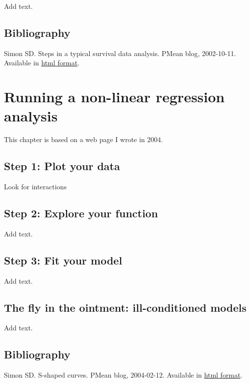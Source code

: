 \documentclass[
  letterpaper,
  DIV=11,
  numbers=noendperiod]{scrreprt}
\begin{document}
\begin{tcolorbox}
Add text.

\section{Bibliography}\label{bibliography-13}

Simon SD. Steps in a typical survival data analysis. PMean blog,
2002-10-11. Available in
\href{http://pmean.com/posts/steps-in-survival-analysis/}{html format}.


\chapter{Running a non-linear regression
analysis}\label{running-a-non-linear-regression-analysis}

This chapter is based on a web page I wrote in 2004.

\section{Step 1: Plot your data}\label{step-1-plot-your-data-2}

Look for interactions

\section{Step 2: Explore your
function}\label{step-2-explore-your-function}

Add text.

\section{Step 3: Fit your model}\label{step-3-fit-your-model}

Add text.

\section{The fly in the ointment: ill-conditioned
models}\label{the-fly-in-the-ointment-ill-conditioned-models}

Add text.

\section{Bibliography}\label{bibliography-14}

Simon SD. S-shaped curves. PMean blog, 2004-02-12. Available in
\href{http://pmean.com/posts/fitting-s-shaped-curves/}{html format}.


\end{tcolorbox}
\end{document}
